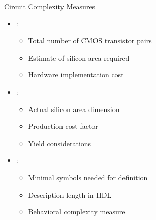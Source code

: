 \begin{frame}{Circuit Complexity Measures}
\begin{itemize}
\item {}:
\begin{itemize}
\item Total number of CMOS transistor pairs
\item Estimate of silicon area required
\item Hardware implementation cost
\end{itemize}
\vspace{0.3cm}
\item {}:
\begin{itemize}
\item Actual silicon area dimension
\item Production cost factor
\item Yield considerations
\end{itemize}
\vspace{0.3cm}
\item {}:
\begin{itemize}
\item Minimal symbols needed for definition
\item Description length in HDL
\item Behavioral complexity measure
\end{itemize}
\end{itemize}
\end{frame}

